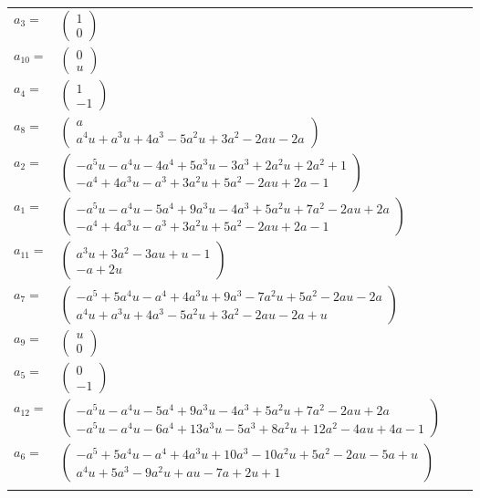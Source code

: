 \documentclass[1p]{elsarticle_modified}
\theoremstyle{definition}
\begin{document}
\begin{tabular}{m{7pt} m{180pt} m{7pt} m{180pt} }
\flushright $a_{3}=$&$\begin{pmatrix}1\\0\end{pmatrix}$ \\
\flushright $a_{10}=$&$\begin{pmatrix}0\\u\end{pmatrix}$ \\
\flushright $a_{4}=$&$\begin{pmatrix}1\\-1\end{pmatrix}$ \\
\flushright $a_{8}=$&$\begin{pmatrix}a\\a^4 u+a^3 u+4 a^3-5 a^2 u+3 a^2-2 a u-2 a\end{pmatrix}$ \\
\flushright $a_{2}=$&$\begin{pmatrix}- a^5 u- a^4 u-4 a^4+5 a^3 u-3 a^3+2 a^2 u+2 a^2+1\\- a^4+4 a^3 u- a^3+3 a^2 u+5 a^2-2 a u+2 a-1\end{pmatrix}$ \\
\flushright $a_{1}=$&$\begin{pmatrix}- a^5 u- a^4 u-5 a^4+9 a^3 u-4 a^3+5 a^2 u+7 a^2-2 a u+2 a\\- a^4+4 a^3 u- a^3+3 a^2 u+5 a^2-2 a u+2 a-1\end{pmatrix}$ \\
\flushright $a_{11}=$&$\begin{pmatrix}a^3 u+3 a^2-3 a u+u-1\\- a+2 u\end{pmatrix}$ \\
\flushright $a_{7}=$&$\begin{pmatrix}- a^5+5 a^4 u- a^4+4 a^3 u+9 a^3-7 a^2 u+5 a^2-2 a u-2 a\\a^4 u+a^3 u+4 a^3-5 a^2 u+3 a^2-2 a u-2 a+u\end{pmatrix}$ \\
\flushright $a_{9}=$&$\begin{pmatrix}u\\0\end{pmatrix}$ \\
\flushright $a_{5}=$&$\begin{pmatrix}0\\-1\end{pmatrix}$ \\
\flushright $a_{12}=$&$\begin{pmatrix}- a^5 u- a^4 u-5 a^4+9 a^3 u-4 a^3+5 a^2 u+7 a^2-2 a u+2 a\\- a^5 u- a^4 u-6 a^4+13 a^3 u-5 a^3+8 a^2 u+12 a^2-4 a u+4 a-1\end{pmatrix}$ \\
\flushright $a_{6}=$&$\begin{pmatrix}- a^5+5 a^4 u- a^4+4 a^3 u+10 a^3-10 a^2 u+5 a^2-2 a u-5 a+u\\a^4 u+5 a^3-9 a^2 u+a u-7 a+2 u+1\end{pmatrix}$\\&\end{tabular}
\end{document}
